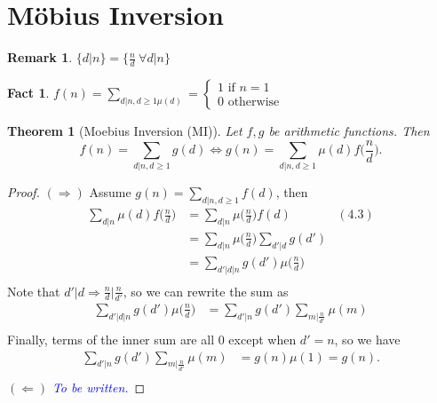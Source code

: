 \documentclass[11pt,letter]{article}
\renewcommand{\implies}{\Rightarrow}
\newcommand{\2}{\{0, 1\}}
\newcommand{\1}{\mathds{1}}
\newcounter{nLectures}
\newcounter{nTheorems}[nLectures]
\newtheorem{theorem}[nTheorems]{Theorem}
\newtheorem{fact}[nTheorems]{Fact}
\theoremstyle{definition}
\newtheorem{remark}[nTheorems]{Remark}
\begin{document}
\section{M\"obius Inversion}
\begin{remark}\label{rem:rem_4_3}
    $\{d\vert n\}=\{\frac{n}{d}\ \forall d\vert n\}$
\end{remark}
\begin{fact}
    $f(n)=\sum_{d\vert n, d\geq 1\mu(d)}=
        \begin{cases} 
            1 \text{ if } n=1\\
            0\text{ otherwise} 
         \end{cases}
    $
\end{fact}
\begin{theorem}[Moebius Inversion (MI)]
    Let $f, g$ be arithmetic functions. Then
    \[  f(n)=\sum_{d\vert n, d\geq 1}g(d) \Longleftrightarrow g(n)=\sum_{d\vert n, d\geq 1}\mu(d)f\Big(\frac{n}{d}\Big). \]
\end{theorem}
\begin{proof}
    $(\Longrightarrow)$ Assume $g(n)=\sum_{d\vert n, d\geq 1}f(d)$, then
    \begin{align*}
        \sum_{d\vert n}\mu(d)f\Big(\frac{n}{d}\Big)&=\sum_{d\vert n}\mu\Big(\frac{n}{d}\Big)f(d)& (\hyperref[rem:rem_4_3]{4.3})\\
        &=\sum_{d\vert n}\mu\Big(\frac{n}{d}\Big)\sum_{d'\vert d}g(d')\\
        &=\sum_{d'\vert d\vert n}g(d')\mu\Big(\frac{n}{d}\Big)\\
    \end{align*}
    Note that $d'\vert d\implies \frac{n}{d}\vert \frac{n}{d'}$, so we can rewrite the sum as
    \begin{align*}
        \sum_{d'\vert d\vert n}g(d')\mu\Big(\frac{n}{d}\Big)&=\sum_{d'\vert n}g(d')\sum_{m\vert \frac{n}{d'}}\mu(m)\\
    \end{align*}
    Finally, terms of the inner sum are all $0$ except when $d'=n$, so we have
    \begin{align*}
        \sum_{d'\vert n}g(d')\sum_{m\vert \frac{n}{d'}}\mu(m)&=g(n)\mu(1)=g(n).\\
    \end{align*}
    $(\Longleftarrow)$
    \textcolor{blue}{\textit{To be written.}}

\end{proof}
\end{document}
